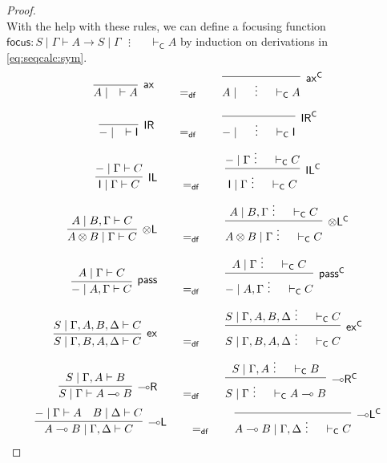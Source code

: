 \documentclass[copyright,creativecommons]{eptcs}
\theoremstyle{definition}
\newcommand{\tl}{\otimes \mathsf{L}}
\newcommand{\lright}{{\multimap}\mathsf{R}}
\newcommand{\lleft}{{\multimap}\mathsf{L}}
\newcommand{\pass}{\mathsf{pass}}
\newcommand{\unitl}{\mathsf{IL}}
\newcommand{\unitr}{\mathsf{IR}}
\newcommand{\ax}{\mathsf{ax}}
\newcommand{\ot}{\otimes}
\newcommand{\lolli}{\multimap}
\newcommand{\I}{\mathsf{I}}
\newcommand{\defeq}{=_{\mathsf{df}}}
\newcommand{\C}{\mathsf{C}}
\newcommand{\ex}{\mathsf{ex}}
\newcommand{\spl}{\text{ } \vdots \text{ }}
\newcommand{\vdc}{\vdash_{\C}}
\begin{document}
\begin{proof}
\begin{equation}
    \end{equation}
  With the help with these rules, we can define a focusing function $\mathsf{focus} : S \mid \Gamma \vdash A \to S \mid \Gamma \spl \quad \vdash_{\C} A$ by induction on derivations in \ref{eq:seqcalc:sym}.
  \begin{displaymath}
    \begin{array}{c}
        \infer[\ax]{A \mid \quad \vdash A}{}
        \qquad
        \defeq
        \qquad
        \infer[\ax^{\C}]{A \mid \quad \spl \quad \vdash_{\C} A}{}
    \\[10pt]
        \infer[\unitr]{{-} \mid \quad \vdash \I}{}
        \qquad
        \defeq
        \qquad
        \infer[\unitr^{\C}]{{-} \mid \quad \spl \quad \vdash_{\C} \I}{}
    \\[6pt]
        \infer[\unitl]{\I \mid \Gamma \vdash C}{
          {-} \mid \Gamma \vdash C
        }
        \qquad
        \defeq
        \qquad
        \infer[\unitl^{\C}]{\I \mid \Gamma \spl \quad \vdash_{\C} C}{
          {-} \mid \Gamma \spl \quad \vdash_{\C} C
        }
    \\[6pt]
        \infer[\tl]{A \ot B \mid \Gamma \vdash C}{A \mid B , \Gamma \vdash C}
        \qquad
        \defeq
        \qquad
        \infer[\tl^{\C}]{A \ot B \mid \Gamma \spl \quad \vdc C}{
          A \mid B , \Gamma \spl \quad \vdc C
        }
    \\[6pt]
        \infer[\pass]{{-} \mid A , \Gamma \vdash C}{A \mid \Gamma \vdash C}
        \qquad
        \defeq
        \qquad
        \infer[\pass^{\C}]{{-} \mid A , \Gamma \spl \quad \vdc C}{
          A \mid \Gamma \spl \quad \vdc C
        }
    \\[6pt]
        \infer[\ex]{S \mid \Gamma , B , A , \Delta \vdash C}{S \mid \Gamma , A , B , \Delta \vdash C}
        \qquad
        \defeq
        \qquad
        \infer[\ex^{\C}]{S \mid \Gamma , B , A , \Delta \spl \quad \vdc C}{
          S \mid \Gamma , A , B , \Delta \spl \quad \vdc C
        }
    \\[6pt]
        \infer[\lright]{S \mid \Gamma \vdash A \lolli B}{S \mid \Gamma , A \vdash B}
        \qquad
        \defeq
        \qquad
        \infer[\lright^{\C}]{S \mid \Gamma \spl \quad \vdc A \lolli B}{
          S \mid \Gamma , A \spl \quad \vdc B
        }
    \\[6pt]
        \infer[\lleft]{A \lolli B \mid \Gamma , \Delta \vdash C}{
          {-} \mid \Gamma \vdash A
          &
          B \mid \Delta \vdash C
        }
        \qquad
        \defeq
        \qquad
        \infer[\lleft^{\C}]{A \lolli B \mid \Gamma , \Delta \spl \quad \vdc C}{
}
\end{array}
\end{displaymath}
\end{proof}
\end{document}
